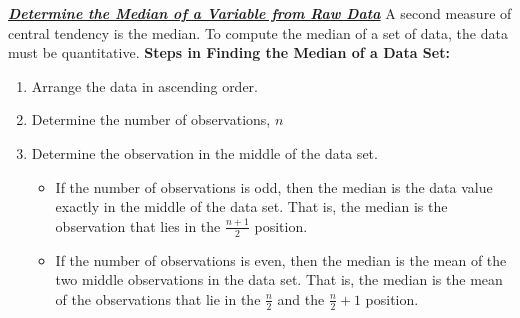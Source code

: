 \documentclass{report}
\begin{document}
        \bigbreak \noindent 
        \textbf{\textit{\underline{Determine the Median of a Variable from Raw Data}}}
        \bigbreak \noindent 
        A second measure of central tendency is the median. To compute the median of a set of data, the data must be quantitative.
        \bigbreak \noindent 
        \textbf{Steps in Finding the Median of a Data Set:}
        \begin{enumerate}
            \item Arrange the data in ascending order.
            \item Determine the number of observations, $n $
            \item Determine the observation in the middle of the data set.
            \begin{itemize}
                \item  If the number of observations is odd, then the median is the data value exactly in the middle of the data set. That is, the median is the observation that lies in the  $\frac{n+1}{2} $ position.
                \item  If the number of observations is even, then the median is the mean of the two middle observations in the data set. That is, the median is the mean of the observations that lie in the $\frac{n}{2}$ and the $\frac{n}{2} + 1 $ position.
            \end{itemize}
        \end{enumerate}
        \bigbreak \noindent 
\end{document}
